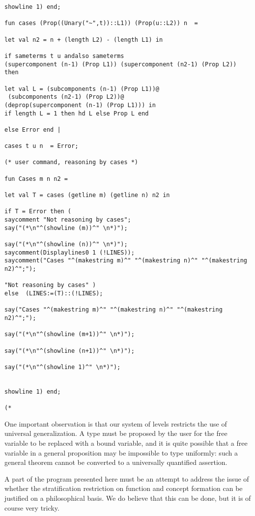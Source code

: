 \documentclass{article}
\begin{document}
{{\begin{verbatim}
showline 1) end;

fun cases (Prop((Unary("~",t))::L1)) (Prop(u::L2)) n  =

let val n2 = n + (length L2) - (length L1) in

if sameterms t u andalso sameterms 
(supercomponent (n-1) (Prop L1)) (supercomponent (n2-1) (Prop L2)) then 

let val L = (subcomponents (n-1) (Prop L1))@
 (subcomponents (n2-1) (Prop L2))@
(deprop(supercomponent (n-1) (Prop L1))) in
if length L = 1 then hd L else Prop L end

else Error end |

cases t u n  = Error;

(* user command, reasoning by cases *)

fun Cases m n n2 =

let val T = cases (getline m) (getline n) n2 in

if T = Error then ( 
saycomment "Not reasoning by cases";
say("(*\n"^(showline (m))^" \n*)"); 

say("(*\n"^(showline (n))^" \n*)"); 
saycomment(Displaylines0 1 (!LINES));
saycomment("Cases "^(makestring m)^" "^(makestring n)^" "^(makestring n2)^";");

"Not reasoning by cases" )
else  (LINES:=(T)::(!LINES);

say("Cases "^(makestring m)^" "^(makestring n)^" "^(makestring n2)^";");

say("(*\n"^(showline (m+1))^" \n*)"); 

say("(*\n"^(showline (n+1))^" \n*)"); 

say("(*\n"^(showline 1)^" \n*)");


showline 1) end;

(*

\end{verbatim}

One important observation is that our system of levels restricts the use of universal generalization.  A type must be proposed by the user for the free variable to be replaced
with a bound variable, and it is quite possible that a free variable in a general proposition may be impossible to type uniformly:  such a general theorem cannot be converted
to a universally quantified assertion.

A part of the program presented here must be an attempt to address the issue of whether the stratification restriction on function and concept formation can be justified on a philosophical basis.  We do believe that this can be done, but it is of course very tricky.

}}
\end{document}
